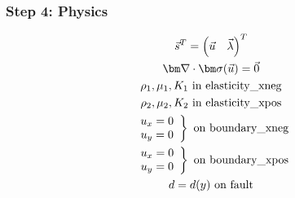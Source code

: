 \documentclass{beamer}
\begin{document}
\begin{frame}
  \frametitle{Step 4: Physics}
  \summary{}

  \begin{minipage}{0.35\textwidth}
    {\scriptsize
    \begin{gather*}
    \vec{s}^T = \left( \vec{u} \quad \vec{\lambda} \right)^T \\
    \tensor{\nabla} \cdot \tensor{\sigma}(\vec{u}) = \vec{0} \\
    \rho_1, \mu_1, K_1 \text{ in elasticity\_xneg} \\ 
    \rho_2, \mu_2, K_2 \text{ in elasticity\_xpos} \\ 
    \left. \begin{array}{c} u_x = 0 \\ u_y = 0 \end{array}\right\} \text{ on boundary\_xneg} \\
    \left. \begin{array}{c} u_x = 0 \\ u_y = 0 \end{array}\right\} \text{ on boundary\_xpos} \\
    d = d(y) \text{ on fault}
    \end{gather*}}
  \end{minipage}
  \hfill
  \begin{minipage}{0.60\textwidth}
  \end{minipage}
      
\end{frame}
\end{document}

